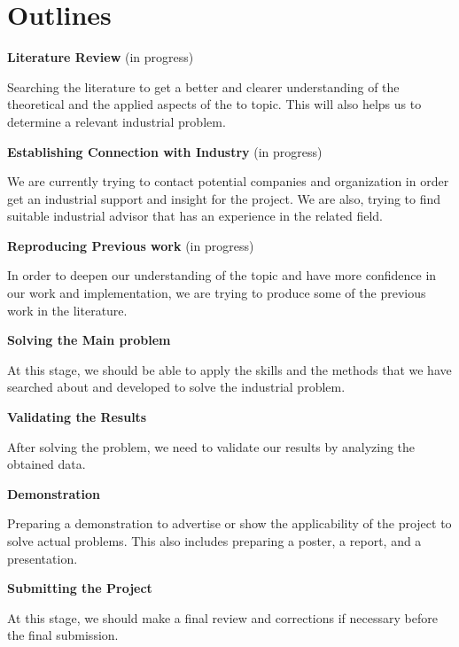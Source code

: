 \documentclass[a4paper, onecolumn, 12pt]{article}
\begin{document}
\newpage
\section*{Outlines}
\begin{itemize}
    {\item \textbf{Literature Review} {\footnotesize(in progress)}}

    Searching the literature to get a better and clearer understanding of the theoretical 
    and the applied aspects of the to topic. This will also helps us to determine a relevant industrial problem.

    {\item \textbf{Establishing Connection with Industry}
    {\footnotesize(in progress)}}

    We are currently trying to contact potential companies and organization in order get an industrial support and insight for the project. We are also, trying to find suitable industrial advisor that has an experience in the related field.

    {\item \textbf{Reproducing Previous work} {\footnotesize(in progress)}}

    In order to deepen our understanding of the topic and have more confidence in our work and implementation, we are trying to produce some of the previous work in the literature.

    {\item \textbf{Solving the Main problem }}
    
    At this stage, we should be able to apply the skills and the methods that we have searched about and developed to solve the industrial problem.

     {\item \textbf{Validating the Results }}

     After solving the problem, we need to validate our results by analyzing the obtained data.

    {\item \textbf{Demonstration}} 

    Preparing a demonstration to advertise or show the applicability of the project to solve actual problems. This also includes preparing a poster, a report, and a presentation.

    {\item \textbf{Submitting the Project}} 
    
    At this stage, we should make a final review and corrections if necessary before the final submission.
    
    
    
\end{itemize}
\end{document}
